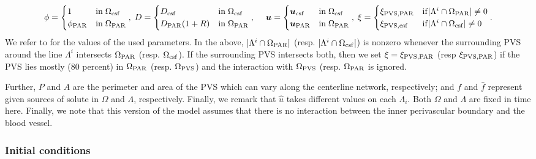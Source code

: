 \documentclass[fleqn,10pt]{wlscirep}
\newcommand{\rami}[1]{\textcolor{blue}{#1}}
\newcommand{\mer}[1]{\textcolor{magenta}{#1}}
\begin{document}
\[
\phi =  \begin{cases}
    1  & \mathrm{in} \;  \Omega_{\rm{csf}} \\ 
    \phi_{\rm{PAR}} & \mathrm{in} \; \Omega_{\rm{PAR}} 
    \end{cases}, \; 
 D= \begin{cases}
    D_{\rm{csf}} & \mathrm{in} \;  \Omega_{\rm{csf}} \\ 
    D_{\rm{PAR}} (1+ R) & \mathrm{in} \; \Omega_{\rm{PAR}} \end{cases}, \; 
    \quad \bm u  = \begin{cases}
    \bm{u}_{\rm{csf}} & \mathrm{in} \; \Omega_{\rm{csf}} \\ 
    \bm{u}_{\rm{PAR}} & \mathrm{in} \; \Omega_{\rm{PAR}} 
\end{cases}, \; 
\xi = \begin{cases}
 \xi_{\rm{PVS}, \rm{PAR}} & \mathrm{if} |\Lambda^i \cap \Omega_{\rm{PAR}}| \neq 0 \\ 
  \xi_{\rm{PVS}, \rm{csf}} & \mathrm{if} |\Lambda^i \cap \Omega_{\rm{csf}}| \neq 0
\end{cases} . 
\]
We refer to  for the values of the used parameters.
In the above,  $|\Lambda^i \cap \Omega_{\rm{PAR}}|$ (resp.  $|\Lambda^i \cap \Omega_{\rm{csf}}|$) is nonzero whenever the surrounding PVS around the line $\Lambda^i$ intersects $\Omega_{\rm{PAR}}$ (resp. $\Omega_{\rm{csf}}$). If the surrounding PVS intersects both, then we set $\xi = \xi_{\mathrm{PVS}, \rm{PAR}}$ (resp $\xi_{\mathrm{PVS}, \rm{PAR}}$) if the PVS lies mostly ($80$ percent) in $\Omega_{\rm{PAR}}$ (resp. $\Omega_{\rm{PVS}}$) and the interaction with $\Omega_{\rm{PVS}}$ (resp. $\Omega_{\rm{PAR}}$ is ignored. 

Further, $P$ and $A$ are the perimeter and area of the PVS which can vary along the centerline network, respectively; and $f$ and $\hat{f}$ represent given sources of solute in $\Omega$ and $\Lambda$, respectively. Finally, we remark that $\hat u$ takes different values on each $\Lambda_i$.  Both $\Omega$ and $\Lambda$ are fixed in time here. Finally, we note that this version of the model assumes that there is no interaction between the inner perivascular boundary and the blood vessel. 

\subsubsection*{Initial conditions}
\end{document}

